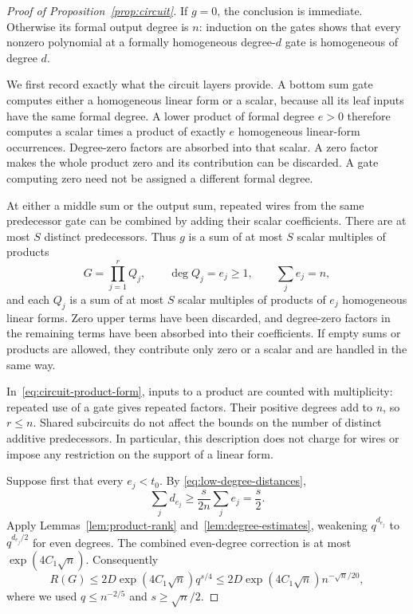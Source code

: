 \begin{proof}[Proof of Proposition~\ref{prop:circuit}]
If $g=0$, the conclusion is immediate.  Otherwise its formal output
degree is $n$: induction on the gates shows that every nonzero
polynomial at a formally homogeneous degree-$d$ gate is homogeneous
of degree $d$.

We first record exactly what the circuit layers provide.  A bottom
sum gate computes either a homogeneous linear form or a scalar,
because all its leaf inputs have the same formal degree.  A lower
product of formal degree $e>0$ therefore computes a scalar times a
product of exactly $e$ homogeneous linear-form occurrences.
Degree-zero factors are absorbed into that scalar.  A zero factor
makes the whole product zero and its contribution can be discarded.
A gate computing zero need not be assigned a different formal degree.

At either a middle sum or the output sum, repeated wires from the
same predecessor gate can be combined by adding their scalar
coefficients.  There are at most $S$ distinct predecessors.  Thus
$g$ is a sum of at most $S$ scalar multiples of products
\begin{equation}
\label{eq:circuit-product-form}
 G=\prod_{j=1}^{r}Q_j,
 \qquad \deg Q_j=e_j\ge1,\qquad \sum_j e_j=n,
\end{equation}
and each $Q_j$ is a sum of at most $S$ scalar multiples of products
of $e_j$ homogeneous linear forms.  Zero upper terms have been
discarded, and degree-zero factors in the remaining terms have been
absorbed into their coefficients.  If empty sums or products are allowed, they
contribute only zero or a scalar and are handled in the same way.

In~\eqref{eq:circuit-product-form}, inputs to a product are counted
with multiplicity: repeated use of a gate gives repeated factors.
Their positive degrees add to $n$, so $r\le n$.  Shared subcircuits
do not affect the bounds on the number of distinct additive
predecessors.  In particular, this description does not charge for
wires or impose any restriction on the support of a linear form.

Suppose first that every $e_j<t_0$.  By
\eqref{eq:low-degree-distances},
\[
 \sum_j d_{e_j}\ge\frac{s}{2n}\sum_j e_j=\frac s2.
\]
Apply Lemmas~\ref{lem:product-rank} and~\ref{lem:degree-estimates},
weakening $q^{d_{e_j}}$ to $q^{d_{e_j}/2}$ for even degrees.  The
combined even-degree correction is at most $\exp(4C_1\sqrt n)$.
Consequently
\begin{equation}
\label{eq:all-low-product}
 R(G)\le2D\exp(4C_1\sqrt n)q^{s/4}
 \le2D\exp(4C_1\sqrt n)n^{-\sqrt n/20},
\end{equation}
where we used $q\le n^{-2/5}$ and $s\ge\sqrt n/2$.


\end{proof}
